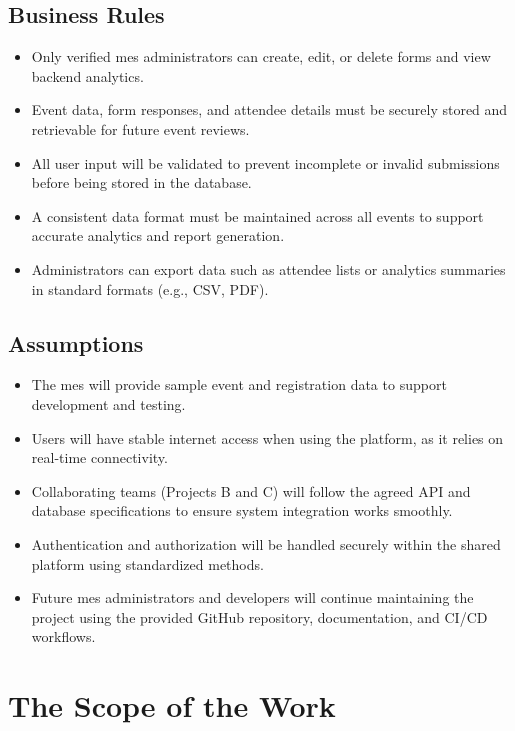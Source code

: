 \documentclass[12pt]{article}
\begin{document}
\subsection{Business Rules}

\begin{itemize}
    \item Only verified \gls{mes} administrators can create, edit, or delete forms and view backend analytics.
    \item Event data, form responses, and attendee details must be securely stored and retrievable for future event
      reviews.
    \item All user input will be validated to prevent incomplete or invalid submissions before being stored in the
      database.
    \item A consistent data format must be maintained across all events to support accurate analytics and report
      generation.
    \item Administrators can export data such as attendee lists or analytics summaries in standard formats (e.g., CSV,
      PDF).
\end{itemize}

\subsection{Assumptions}

\begin{itemize}
    \item The \gls{mes} will provide sample event and registration data to support development and testing.
    \item Users will have stable internet access when using the platform, as it relies on real-time connectivity.
    \item Collaborating teams (Projects B and C) will follow the agreed API and database specifications to ensure system
      integration works smoothly.
    \item Authentication and authorization will be handled securely within the shared platform using standardized
      methods.
    \item Future \gls{mes} administrators and developers will continue maintaining the project using the provided GitHub
      repository, documentation, and CI/CD workflows.
\end{itemize}


\section{The Scope of the Work}
\end{document}
